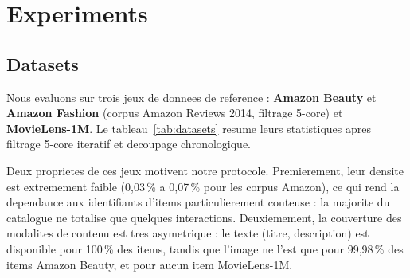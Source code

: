 %
%
%

\section{Experiments}
\label{sec:experiments}

\subsection{Datasets}
\label{sec:datasets}

Nous evaluons \model{} sur trois jeux de donnees de reference :
\textbf{Amazon Beauty} et \textbf{Amazon Fashion} (corpus Amazon Reviews 2014,
filtrage 5-core) et \textbf{MovieLens-1M}. Le tableau~\ref{tab:datasets} resume
leurs statistiques apres filtrage 5-core iteratif et decoupage chronologique.

Deux proprietes de ces jeux motivent notre protocole. Premierement, leur
densite est extremement faible (0,03\,\% a 0,07\,\% pour les corpus Amazon),
ce qui rend la dependance aux identifiants d'items particulierement
couteuse : la majorite du catalogue ne totalise que quelques interactions.
Deuxiemement, la couverture des modalites de contenu est tres asymetrique :
le texte (titre, description) est disponible pour 100\,\% des items, tandis que
l'image ne l'est que pour 99,98\,\% des items Amazon Beauty, et pour aucun item
MovieLens-1M.

